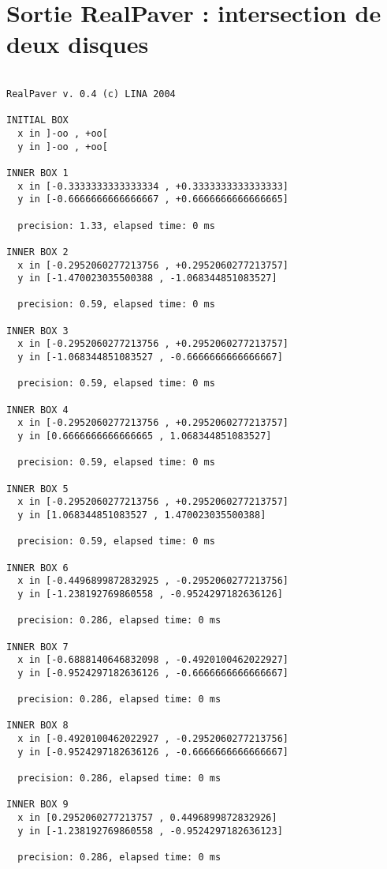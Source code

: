 \appendix
\chapter{Sortie RealPaver : intersection de deux disques}\label{chap:realout}
\begin{verbatim}

RealPaver v. 0.4 (c) LINA 2004

INITIAL BOX
  x in ]-oo , +oo[
  y in ]-oo , +oo[

INNER BOX 1
  x in [-0.3333333333333334 , +0.3333333333333333]
  y in [-0.6666666666666667 , +0.6666666666666665]

  precision: 1.33, elapsed time: 0 ms

INNER BOX 2
  x in [-0.2952060277213756 , +0.2952060277213757]
  y in [-1.470023035500388 , -1.068344851083527]

  precision: 0.59, elapsed time: 0 ms

INNER BOX 3
  x in [-0.2952060277213756 , +0.2952060277213757]
  y in [-1.068344851083527 , -0.6666666666666667]

  precision: 0.59, elapsed time: 0 ms

INNER BOX 4
  x in [-0.2952060277213756 , +0.2952060277213757]
  y in [0.6666666666666665 , 1.068344851083527]

  precision: 0.59, elapsed time: 0 ms

INNER BOX 5
  x in [-0.2952060277213756 , +0.2952060277213757]
  y in [1.068344851083527 , 1.470023035500388]

  precision: 0.59, elapsed time: 0 ms

INNER BOX 6
  x in [-0.4496899872832925 , -0.2952060277213756]
  y in [-1.238192769860558 , -0.9524297182636126]

  precision: 0.286, elapsed time: 0 ms

INNER BOX 7
  x in [-0.6888140646832098 , -0.4920100462022927]
  y in [-0.9524297182636126 , -0.6666666666666667]

  precision: 0.286, elapsed time: 0 ms

INNER BOX 8
  x in [-0.4920100462022927 , -0.2952060277213756]
  y in [-0.9524297182636126 , -0.6666666666666667]

  precision: 0.286, elapsed time: 0 ms

INNER BOX 9
  x in [0.2952060277213757 , 0.4496899872832926]
  y in [-1.238192769860558 , -0.9524297182636123]

  precision: 0.286, elapsed time: 0 ms


\end{verbatim}
